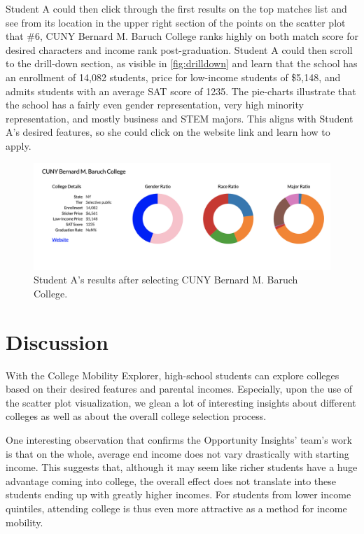 \documentclass{vgtc}
\begin{document}
Student A could then click through the first results on the top matches list and see from its location in the upper right section of the points on the scatter plot that \#6, CUNY Bernard M. Baruch College ranks highly on both match score for desired characters and income rank post-graduation. Student A could then scroll to the drill-down section, as visible in \autoref{fig:drilldown} and learn that the school has an enrollment of 14,082 students, price for low-income students of \$5,148, and admits students with an average SAT score of 1235. The pie-charts illustrate that the school has a fairly even gender representation, very high minority representation, and mostly business and STEM majors. This aligns with Student A’s desired features, so she could click on the website link and learn how to apply.

\begin{figure}[tbh]
 \centering
 \includegraphics[width=\columnwidth]{drilldown.png}
 \caption{Student A's results after selecting CUNY Bernard M. Baruch College.}
 \label{fig:drilldown}
\end{figure}

\section{Discussion}
With the College Mobility Explorer, high-school students can explore colleges based on their desired features and parental incomes. Especially, upon the use of the scatter plot visualization, we glean a lot of interesting insights about different colleges as well as about the overall college selection process.

One interesting observation that confirms the Opportunity Insights' team's work is that on the whole, average end income does not vary drastically with starting income. This suggests that, although it may seem like richer students have a huge advantage coming into college, the overall effect does not translate into these students ending up with greatly higher incomes. For students from lower income quintiles, attending college is thus even more attractive as a method for income mobility.
\end{document}
